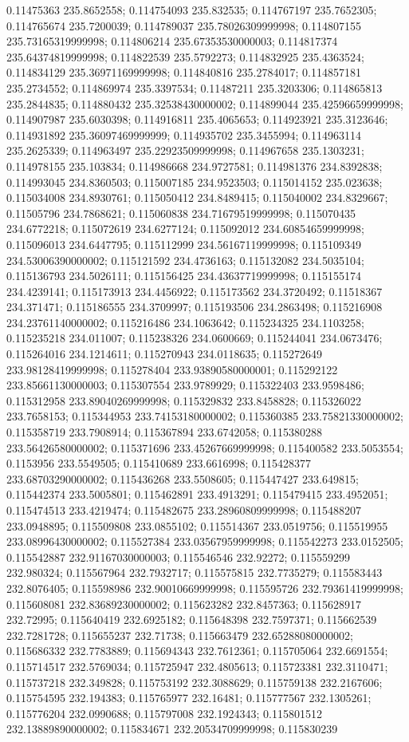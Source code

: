 0.11475363 235.8652558; 0.114754093 235.832535; 0.114767197 235.7652305; 0.114765674 235.7200039; 0.114789037 235.78026309999998; 0.114807155 235.73165319999998; 0.114806214 235.67353530000003; 0.114817374 235.64374819999998; 0.114822539 235.5792273; 0.114832925 235.4363524; 0.114834129 235.36971169999998; 0.114840816 235.2784017; 0.114857181 235.2734552; 0.114869974 235.3397534; 0.11487211 235.3203306; 0.114865813 235.2844835; 0.114880432 235.32538430000002; 0.114899044 235.42596659999998; 0.114907987 235.6030398; 0.114916811 235.4065653; 0.114923921 235.3123646; 0.114931892 235.36097469999999; 0.114935702 235.3455994; 0.114963114 235.2625339; 0.114963497 235.22923509999998; 0.114967658 235.1303231; 0.114978155 235.103834; 0.114986668 234.9727581; 0.114981376 234.8392838; 0.114993045 234.8360503; 0.115007185 234.9523503; 0.115014152 235.023638; 0.115034008 234.8930761; 0.115050412 234.8489415; 0.115040002 234.8329667; 0.11505796 234.7868621; 0.115060838 234.71679519999998; 0.115070435 234.6772218; 0.115072619 234.6277124; 0.115092012 234.60854659999998; 0.115096013 234.6447795; 0.115112999 234.56167119999998; 0.115109349 234.53006390000002; 0.115121592 234.4736163; 0.115132082 234.5035104; 0.115136793 234.5026111; 0.115156425 234.43637719999998; 0.115155174 234.4239141; 0.115173913 234.4456922; 0.115173562 234.3720492; 0.11518367 234.371471; 0.115186555 234.3709997; 0.115193506 234.2863498; 0.115216908 234.23761140000002; 0.115216486 234.1063642; 0.115234325 234.1103258; 0.115235218 234.011007; 0.115238326 234.0600669; 0.115244041 234.0673476; 0.115264016 234.1214611; 0.115270943 234.0118635; 0.115272649 233.98128419999998; 0.115278404 233.93890580000001; 0.115292122 233.85661130000003; 0.115307554 233.9789929; 0.115322403 233.9598486; 0.115312958 233.89040269999998; 0.115329832 233.8458828; 0.115326022 233.7658153; 0.115344953 233.74153180000002; 0.115360385 233.75821330000002; 0.115358719 233.7908914; 0.115367894 233.6742058; 0.115380288 233.56426580000002; 0.115371696 233.45267669999998; 0.115400582 233.5053554; 0.1153956 233.5549505; 0.115410689 233.6616998; 0.115428377 233.68703290000002; 0.115436268 233.5508605; 0.115447427 233.649815; 0.115442374 233.5005801; 0.115462891 233.4913291; 0.115479415 233.4952051; 0.115474513 233.4219474; 0.115482675 233.28960809999998; 0.115488207 233.0948895; 0.115509808 233.0855102; 0.115514367 233.0519756; 0.115519955 233.08996430000002; 0.115527384 233.03567959999998; 0.115542273 233.0152505; 0.115542887 232.91167030000003; 0.115546546 232.92272; 0.115559299 232.980324; 0.115567964 232.7932717; 0.115575815 232.7735279; 0.115583443 232.8076405; 0.115598986 232.90010669999998; 0.115595726 232.79361419999998; 0.115608081 232.83689230000002; 0.115623282 232.8457363; 0.115628917 232.72995; 0.115640419 232.6925182; 0.115648398 232.7597371; 0.115662539 232.7281728; 0.115655237 232.71738; 0.115663479 232.65288080000002; 0.115686332 232.7783889; 0.115694343 232.7612361; 0.115705064 232.6691554; 0.115714517 232.5769034; 0.115725947 232.4805613; 0.115723381 232.3110471; 0.115737218 232.349828; 0.115753192 232.3088629; 0.115759138 232.2167606; 0.115754595 232.194383; 0.115765977 232.16481; 0.115777567 232.1305261; 0.115776204 232.0990688; 0.115797008 232.1924343; 0.115801512 232.13889890000002; 0.115834671 232.20534709999998; 0.115830239 